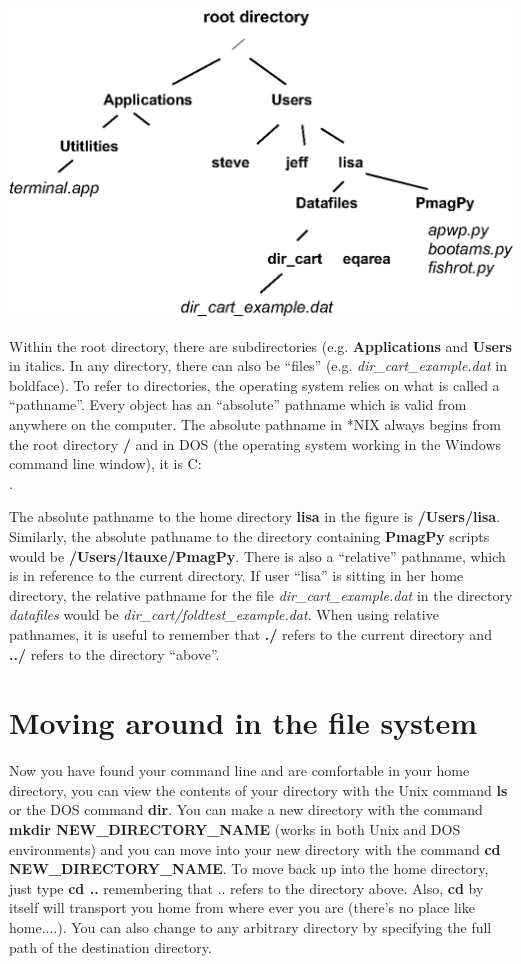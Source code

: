 \documentclass[11pt]{book}
\begin{document}
  \includegraphics[width=15 cm]{EPSfiles/filesys.eps}

 Within the root directory, there are subdirectories
(e.g. {\bf Applications} and {\bf Users} in italics.  In any directory, there can also be ``files''
(e.g. {\it dir\_cart\_example.dat} in boldface).   To
refer to directories,  the operating system relies on what is called a ``pathname''. Every object
has an ``absolute'' pathname which is valid from anywhere on the computer.  The
absolute pathname in *NIX always begins from the root directory {\bf /} and in DOS (the operating system working in the Windows command line window), it is C:\\. 

The absolute pathname to the home directory {\bf lisa} in the figure is {\bf /Users/lisa}.  
Similarly, the absolute pathname to the directory containing {\bf PmagPy}  
scripts  would be  {\bf /Users/ltauxe/PmagPy}.  There is also a ``relative'' pathname,
which is in reference to the  current directory.  If user ``lisa'' is sitting in 
her home directory, the relative pathname for the file {\it dir\_cart\_example.dat} in the directory
{\it datafiles} would be {\it dir\_cart/foldtest\_example.dat}.  When using relative
pathnames, it is useful to remember that {\bf ./} refers to the current
directory and {\bf ../} refers to the directory  ``above''.     

\section{Moving around in the file system}

Now you have found your command line and are comfortable in your home directory, you can view the contents of your directory with the Unix command {\bf ls} or the DOS command {\bf dir}.  
You can make a new directory with the command {\bf mkdir NEW\_DIRECTORY\_NAME} (works in both Unix and DOS environments) and you can move into your new directory with the command {\bf cd NEW\_DIRECTORY\_NAME}.   To move back up into the home directory, just type {\bf cd ..} remembering that .. refers to the directory above.  Also, {\bf cd} by itself will transport you home from where ever you are (there's no place like home....).     You can also change to any arbitrary directory by specifying the full path of the destination directory. 
\end{document}
